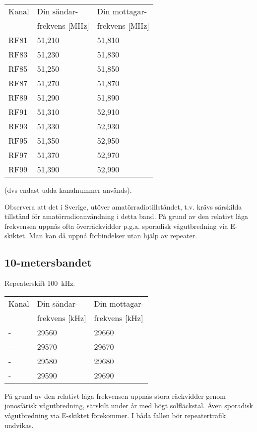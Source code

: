 \begin{tabular}{ l | l | l }
  Kanal & Din sändar- & Din mottagar- \\
        & frekvens [MHz] & frekvens [MHz] \\
  \hline
  RF81 & 51,210 & 51,810 \\
  RF83 & 51,230 & 51,830 \\
  RF85 & 51,250 & 51,850 \\
  RF87 & 51,270 & 51,870 \\
  RF89 & 51,290 & 51,890 \\
  RF91 & 51,310 & 52,910 \\
  RF93 & 51,330 & 52,930 \\
  RF95 & 51,350 & 52,950 \\
  RF97 & 51,370 & 52,970 \\
  RF99 & 51,390 & 52,990 \\
\end{tabular}

(dvs endast udda kanalnummer används).

Observera att det i Sverige, utöver amatörradiotillståndet, t.v. krävs
särskilda tillstånd för amatörradioanvändning i detta band.
På grund av den relativt låga frekvensen uppnås ofta överräckvidder p.g.a.
sporadisk vågutbredning via E-skiktet.
Man kan då uppnå förbindelser utan hjälp av repeater.

\subsection{10-metersbandet}
Repeaterskift 100~kHz.

\begin{tabular}{ l | l | l }
  Kanal & Din sändar- & Din mottagar- \\
        & frekvens [kHz] & frekvens [kHz] \\
  \hline
  - & 29560 & 29660 \\
  - & 29570 & 29670 \\
  - & 29580 & 29680 \\
  - & 29590 & 29690 \\
\end{tabular}

På grund av den relativt låga frekvensen uppnås stora räckvidder genom
jonosfärisk vågutbredning, särskilt under år med högt solfläckstal.
Även sporadisk vågutbredning via E-skiktet förekommer.
I båda fallen bör repeatertrafik undvikas.
